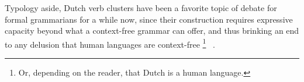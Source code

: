 Typology aside, Dutch verb clusters have been a favorite topic of debate for formal grammarians for a while now, since their construction requires expressive capacity beyond what a context-free grammar can offer, and thus brinking an end to any delusion that human languages are context-free%
	\footnote{Or, depending on the reader, that Dutch is a human language.}%
~\cite{huybregts1984weak,shieber1985evidence}.







%	
%	
%	
%	    






\nocite{augustinus2015complement}


